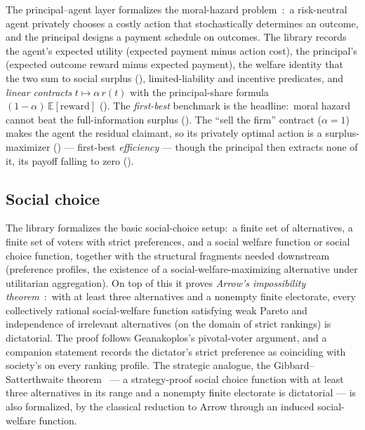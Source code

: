 The principal–agent layer 
formalizes the moral-hazard problem~\citep{Holmstrom1979}:\ a
risk-neutral agent privately chooses a costly action that
stochastically determines an outcome, and the principal designs a
payment schedule on outcomes.  The library records the agent's expected
utility (expected payment minus action cost), the principal's (expected
outcome reward minus expected payment), the welfare identity that the
two sum to social surplus
(), limited-liability and
incentive predicates, and \emph{linear contracts}
$t \mapsto \alpha\,r(t)$ with the principal-share formula
$(1-\alpha)\,\mathbb{E}[\mathrm{reward}]$
().  The \emph{first-best} benchmark
is the headline:\ moral hazard cannot beat the full-information surplus
().  The ``sell the firm'' contract
($\alpha = 1$) makes the agent the residual claimant, so its privately
optimal action is a surplus-maximizer
() — first-best
\emph{efficiency} — though the principal then extracts none of it, its
payoff falling to zero ().


\subsection{Social choice}
\label{sec:mech:social}

The library formalizes the basic social-choice setup:\ a finite
set of alternatives, a finite set of voters with strict
preferences, and a social welfare function or social choice
function, together with the structural fragments needed downstream
(preference profiles, the existence of a social-welfare-maximizing
alternative under utilitarian aggregation).  On top of this it
proves \emph{Arrow's impossibility theorem}~\citep{Arrow1951}:\
with at least three alternatives and a nonempty finite electorate,
every collectively rational social-welfare function satisfying weak
Pareto and independence of irrelevant alternatives (on the domain of
strict rankings) is dictatorial.  The proof follows Geanakoplos's
pivotal-voter argument, and a companion statement records the
dictator's strict preference as coinciding with society's on every
ranking profile.  The strategic analogue, the
Gibbard–Satterthwaite theorem~\citep{Gibbard1973, Satterthwaite1975}
— a strategy-proof social choice function with at least three
alternatives in its range and a nonempty finite electorate is
dictatorial — is also formalized, by the classical reduction to
Arrow through an induced social-welfare function.

